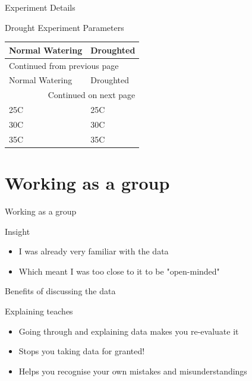 \documentclass[t, aspectratio=169]{beamer}
\begin{document}
\begin{frame}[label={sec:orgef2e2c6}]{Experiment Details}
\begin{block}{Drought Experiment Parameters}
\begin{longtable}{l|l}
\alert{Normal Watering} & \alert{Droughted}\\
\hline
\endfirsthead
\multicolumn{2}{l}{Continued from previous page} \\
\hline

\alert{Normal Watering} & \alert{Droughted} \\

\hline
\endhead
\hline\multicolumn{2}{r}{Continued on next page} \\
\endfoot
\endlastfoot
\hline
25C & 25C\\
30C & 30C\\
35C & 35C\\
\end{longtable}
\end{block}
\end{frame}


\section{Working as a group}
\label{sec:orgcbe63bb}
\begin{frame}[label={sec:org4bd19e5}]{Working as a group}
\begin{block}{Insight}
\begin{itemize}
\item I was already very familiar with the data
\item Which  meant I was too close to it to be "open-minded"
\end{itemize}
\end{block}
\end{frame}

\begin{frame}[label={sec:org0fec998}]{Benefits of discussing the data}
\begin{block}{Explaining teaches}
\begin{itemize}
\item Going through and explaining data makes you re-evaluate it
\item Stops you taking data for granted!
\item Helps you recognise your own mistakes and misunderstandings
\end{itemize}
\end{block}
\end{frame}
\end{document}
